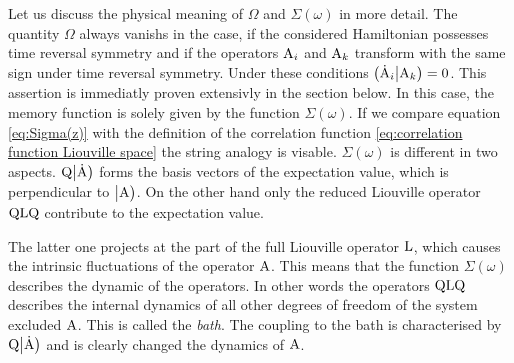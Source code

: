 Let us discuss the physical meaning of $\Omega$ and $\Sigma(\omega)$ in more detail.
The quantity $\Omega$ always vanishs in the case, if the considered Hamiltonian possesses time reversal symmetry and if the operators $\mathrm{A}_{i}$ and $\mathrm{A}_{k}$ transform with the same sign under time reversal symmetry.
Under these conditions $\big({\dot{\mathrm{A}}_{i}}\big|{\mathrm{A}_{k}}\big) = 0$.
This assertion is immediatly proven extensivly in the section below.
In this case, the memory function is solely given by the function $\Sigma(\omega)$.
If we compare equation \eqref{eq:Sigma(z)} with the definition of the correlation function \eqref{eq:correlation function Liouville space} the string analogy is visable.
$\Sigma(\omega)$ is different in two aspects.
$\mathrm{Q} \big|{\dot{\mathrm{A}}}\big)$ forms the basis vectors of the expectation value, which is perpendicular to $\big|{\mathrm{A}}\big)$.
On the other hand only the reduced Liouville operator $\mathrm{QLQ}$ contribute to the expectation value.

The latter one projects at the part of the full Liouville operator $\mathrm{L}$, which causes the intrinsic fluctuations of the operator $\mathrm{A}$.
This means that the function $\Sigma(\omega)$ describes the dynamic of the operators.
In other words the operators $\mathrm{QLQ}$ describes the internal dynamics of all other degrees of freedom of the system excluded $\mathrm{A}$.
This is called the \emph{bath}.
The coupling to the bath is characterised by $\mathrm{Q} \big|{\dot{\mathrm{A}}}\big)$ and is clearly changed the dynamics of $\mathrm{A}$.
%
%
